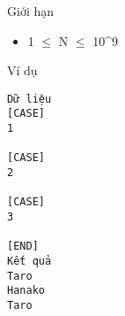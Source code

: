 Giới hạn  
\begin{itemize}
	\item     1  $\le$  N  $\le$  10^9   
\end{itemize}
   Ví dụ  
\begin{verbatim}
Dữ liệu
[CASE]
1

[CASE]
2

[CASE]
3

[END]
Kết quả
Taro
Hanako
Taro
\end{verbatim}